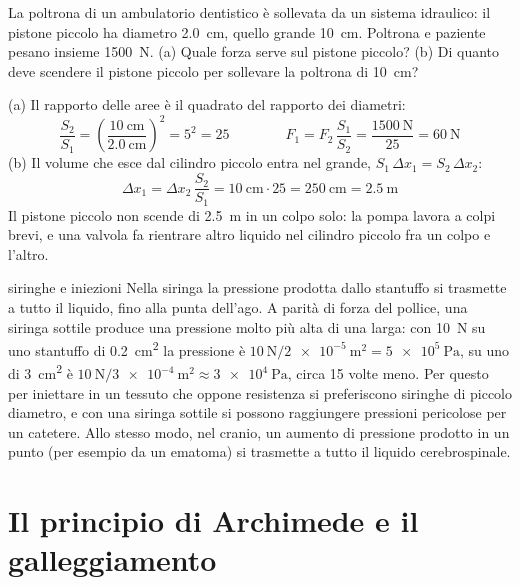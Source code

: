 \begin{esempio}
La poltrona di un ambulatorio dentistico è sollevata da un sistema idraulico: il pistone piccolo ha diametro \SI{2,0}{\centi\metre}, quello grande \SI{10}{\centi\metre}. Poltrona e paziente pesano insieme \SI{1500}{\newton}. (a) Quale forza serve sul pistone piccolo? (b) Di quanto deve scendere il pistone piccolo per sollevare la poltrona di \SI{10}{\centi\metre}?

(a) Il rapporto delle aree è il quadrato del rapporto dei diametri:
\[
  \frac{S_2}{S_1} = \left(\frac{\SI{10}{\centi\metre}}{\SI{2,0}{\centi\metre}}\right)^{2} = 5^2 = 25
  \qquad\qquad
  F_1 = F_2\,\frac{S_1}{S_2} = \frac{\SI{1500}{\newton}}{25} = \SI{60}{\newton}
\]
(b) Il volume che esce dal cilindro piccolo entra nel grande, $S_1\,\Delta x_1 = S_2\,\Delta x_2$:
\[
  \Delta x_1 = \Delta x_2\,\frac{S_2}{S_1} = \SI{10}{\centi\metre} \cdot 25 = \SI{250}{\centi\metre} = \SI{2,5}{\metre}
\]
Il pistone piccolo non scende di \SI{2,5}{\metre} in un colpo solo: la pompa lavora a colpi brevi, e una valvola fa rientrare altro liquido nel cilindro piccolo fra un colpo e l'altro.
\end{esempio}



\begin{applicazione}{siringhe e iniezioni}
Nella siringa la pressione prodotta dallo stantuffo si trasmette a tutto il liquido, fino alla punta dell'ago. A parità di forza del pollice, una siringa sottile produce una pressione molto più alta di una larga: con \SI{10}{\newton} su uno stantuffo di \SI{0,2}{\centi\metre\squared} la pressione è $\SI{10}{\newton}/\SI{2e-5}{\metre\squared} = \SI{5e5}{\pascal}$, su uno di \SI{3}{\centi\metre\squared} è $\SI{10}{\newton}/\SI{3e-4}{\metre\squared} \approx \SI{3e4}{\pascal}$, circa 15 volte meno. Per questo per iniettare in un tessuto che oppone resistenza si preferiscono siringhe di piccolo diametro, e con una siringa sottile si possono raggiungere pressioni pericolose per un catetere. Allo stesso modo, nel cranio, un aumento di pressione prodotto in un punto (per esempio da un ematoma) si trasmette a tutto il liquido cerebrospinale.
\end{applicazione}

\section{Il principio di Archimede e il galleggiamento}
\label{sec:ud3-archimede}

